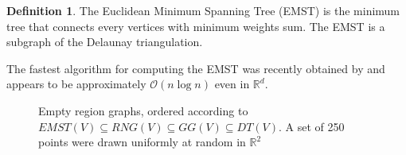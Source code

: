 \documentclass[12pt, oneside, extrafontsizes]{memoir}  %
\theoremstyle{plain}
\theoremstyle{definition}
\newtheorem{defn}{Definition}[section]
\begin{document}
\begin{defn}
The Euclidean Minimum Spanning Tree (EMST) is the minimum tree that connects every vertices with minimum weights sum. The EMST is a subgraph of the Delaunay triangulation.
\end{defn}

The fastest algorithm for computing the EMST was recently obtained by \cite{March2010} and appears to be approximately $\mathcal{O}(n \log n)$ even in $\mathbb{R}^d$.
 
 \begin{figure}
  \centering
    \caption{Empty region graphs, ordered according to $EMST(V) \subseteq RNG(V) \subseteq GG(V) \subseteq DT(V)$. A set of 250 points were drawn uniformly at random in $\mathbb{R}^2$}
\end{figure}
\end{document}
